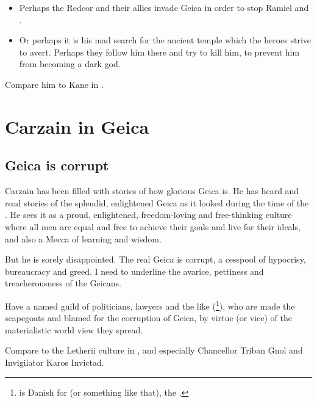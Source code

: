 \begin{itemize}
  \item 
    Perhaps the Redcor and their allies invade Geica in order to stop Ramiel and \Belzir. 
  \item 
    Or perhaps it is his mad search for the ancient temple which the heroes strive to avert. 
    Perhaps they follow him there and try to kill him, to prevent him from becoming a dark god. 
\end{itemize}

Compare him to Kane in \cite{KarlEdwardWagner:DarknessWeaves,KarlEdwardWagner:Bloodstone,KarlEdwardWagner:DarkCrusade}. 















\section{Carzain in Geica}
\subsection{Geica is corrupt}
Carzain has been filled with stories of how glorious Geica is. He has heard and read stories of the splendid, enlightened Geica as it looked during the time of the . He sees it as a proud, enlightened, freedom-loving and free-thinking culture where all men are equal and free to achieve their goals and live for their ideals, and also a Mecca of learning and wisdom. 

But he is sorely disappointed. The real Geica is corrupt, a cesspool of hypocrisy, bureaucracy and greed. I need to underline the avarice, pettiness and treacherousness of the Geicans. 

Have a named guild of politicians, lawyers and the like (\footnote{\quo{\DJOF} is Danish for  (or something like that), the .}), who are made the scapegoats and blamed for the corruption of Geica, by virtue (or vice) of the materialistic world view they spread. 

Compare to the Letherii culture in \cite{StevenEriksonIanCameronEsslemont:MalazanBookoftheFallen}, and especially Chancellor Triban Gnol and Invigilator Karos Invictad. 

